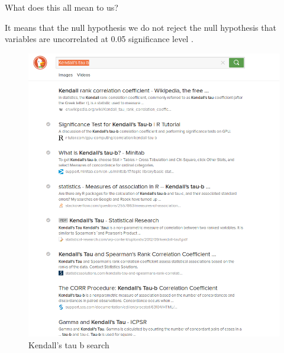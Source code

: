 \documentclass[letterpaper,10pt]{article}
\begin{document}
What does this all mean to us? 

It means that the null hypothesis we do not reject the null hypothesis that variables are uncorrelated at 0.05 significance level \cite{taubr}. 
\newpage


\begin{figure}[p]
	\includegraphics[scale=0.5]{KendallTauSearch.png}
	\caption{Kendall's tau b search}
    \label{fig:searchktb}
\end{figure}



 
\clearpage

        
\end{document}
